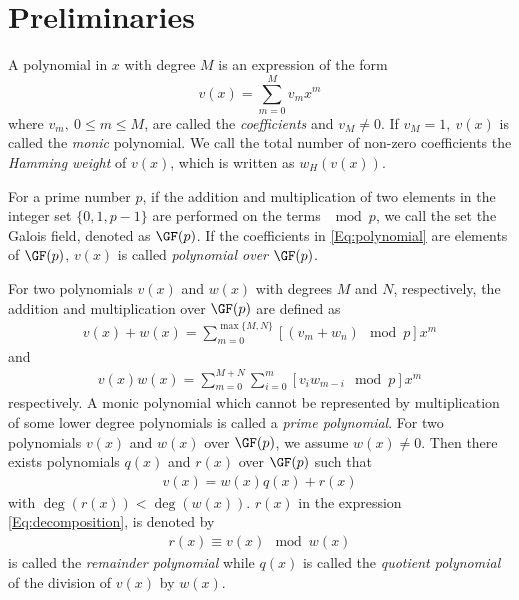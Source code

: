 \section{Preliminaries}
\label{secPrelim}

A polynomial in $x$ with degree $M$ is an expression of the form
\begin{equation}
v(x) = \sum_{m=0}^{M} v_mx^m
\label{Eq:polynomial}
\end{equation}
where $v_m,~0 \leq m \leq M$, are called the \textit{coefficients} and $v_M \neq 0$. If $v_M=1,~v(x)$ is called the \textit{monic} polynomial. We call the total number of non-zero coefficients the \textit{Hamming weight} of $v(x)$, which is written as $w_H(v(x))$.


For a prime number $p$, if the addition and multiplication of two elements in the integer set $\{ 0,1,p-1\}$ are performed on the terms $\mod p$, we call the set the Galois field, denoted as $\GF(p)$. If the coefficients in \eqref{Eq:polynomial} are elements of $\GF(p)$, $v(x)$ is called {\it polynomial over} $\GF(p)$.


For two polynomials $v(x)$ and $w(x)$ with degrees $M$ and $N$, respectively, the addition and multiplication over $\GF(p)$ are defined as 
\begin{align}
v(x)+w(x)=\sum_{m=0}^{\max\{ M,N\}} [(v_m +w_n)\mod p] x^m
\label{Eq:addition}
\end{align}
and
\begin{align}
v(x)w(x)=\sum_{m=0}^{ M+N} \sum_{i=0}^{m} [v_i w_{m-i}\mod p]x^m
\label{Eq:multiplication}
\end{align}
respectively. 
A monic polynomial which cannot be represented by multiplication of some lower degree polynomials is called a \textit{prime polynomial}.
For two polynomials $v(x)$ and $w(x)$ over $\GF(p)$, we assume $w(x) \neq 0$. Then there exists polynomials $q(x)$ and $r(x)$ 
over $\GF(p)$ such that 
\begin{align}
v(x) = w(x)q(x)+r(x)
\label{Eq:decomposition}
\end{align}
with $\deg(r(x)) < \deg(w(x))$. $r(x)$ in the expression \eqref{Eq:decomposition}, is denoted by
\begin{align}
r(x) \equiv v(x)\mod w(x)
\end{align}
is called the \textit{remainder polynomial} while $q(x)$ is called the \textit{quotient polynomial} of the division of $v(x)$ by $w(x)$.

